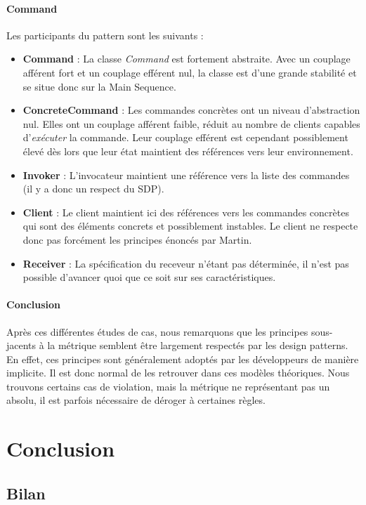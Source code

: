 \documentclass{scrartcl}
\begin{document}
    \paragraph{Command}Les participants du pattern sont les suivants :
    \begin{itemize}
        \item \textbf{Command} : La classe \emph{Command} est fortement abstraite. Avec un couplage afférent fort et un couplage efférent nul, la classe est d'une grande stabilité et se situe donc sur la Main Sequence.
        \item \textbf{ConcreteCommand} : Les commandes concrètes ont un niveau d'abstraction nul. Elles ont un couplage afférent faible, réduit au nombre de clients capables d'\emph{exécuter} la commande. Leur couplage efférent est cependant possiblement élevé dès lors que leur état maintient des références vers leur environnement.
        \item \textbf{Invoker} : L'invocateur maintient une référence vers la liste des commandes (il y a donc un respect du SDP).
        \item \textbf{Client} : Le client maintient ici des références vers les commandes concrètes qui sont des éléments concrets et possiblement instables. Le client ne respecte donc pas forcément les principes énoncés par Martin.
        \item \textbf{Receiver} : La spécification du receveur n'étant pas déterminée, il n'est pas possible d'avancer quoi que ce soit sur ses caractéristiques.
    \end{itemize}
    
    \paragraph{Conclusion}Après ces différentes études de cas, nous remarquons que les principes sous-jacents à la métrique semblent être largement respectés par les design patterns. En effet, ces principes sont généralement adoptés par les développeurs de manière implicite. Il est donc normal de les retrouver dans ces modèles théoriques. Nous trouvons certains cas de violation, mais la métrique ne représentant pas un absolu, il est parfois nécessaire de déroger à certaines règles.


\newpage
\section{Conclusion}
\subsection{Bilan}
\end{document}
